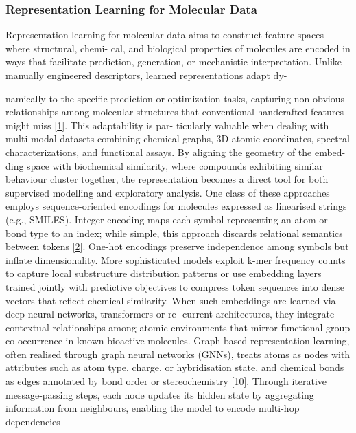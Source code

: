 \documentclass[
]{article}
\begin{document}
\subsubsection{Representation Learning for Molecular
Data}\label{representation-learning-for-molecular-data}

Representation learning for molecular data aims to construct feature
spaces where structural, chemi- cal, and biological properties of
molecules are encoded in ways that facilitate prediction, generation, or
mechanistic interpretation. Unlike manually engineered descriptors,
learned representations adapt dy-

namically to the specific prediction or optimization tasks, capturing
non-obvious relationships among molecular structures that conventional
handcrafted features might miss {[}\hyperref[_bookmark41]{1}{]}. This
adaptability is par- ticularly valuable when dealing with multi-modal
datasets combining chemical graphs, 3D atomic coordinates, spectral
characterizations, and functional assays. By aligning the geometry of
the embed- ding space with biochemical similarity, where compounds
exhibiting similar behaviour cluster together, the representation
becomes a direct tool for both supervised modelling and exploratory
analysis. One class of these approaches employs sequence-oriented
encodings for molecules expressed as linearised strings (e.g., SMILES).
Integer encoding maps each symbol representing an atom or bond type to
an index; while simple, this approach discards relational semantics
between tokens {[}\hyperref[_bookmark42]{2}{]}. One-hot encodings
preserve independence among symbols but inflate dimensionality. More
sophisticated models exploit k-mer frequency counts to capture local
substructure distribution patterns or use embedding layers trained
jointly with predictive objectives to compress token sequences into
dense vectors that reflect chemical similarity. When such embeddings are
learned via deep neural networks, transformers or re- current
architectures, they integrate contextual relationships among atomic
environments that mirror functional group co-occurrence in known
bioactive molecules. Graph-based representation learning, often realised
through graph neural networks (GNNs), treats atoms as nodes with
attributes such as atom type, charge, or hybridisation state, and
chemical bonds as edges annotated by bond order or stereochemistry
{[}\hyperref[_bookmark50]{10}{]}. Through iterative message-passing
steps, each node updates its hidden state by aggregating information
from neighbours, enabling the model to encode multi-hop dependencies
\end{document}
